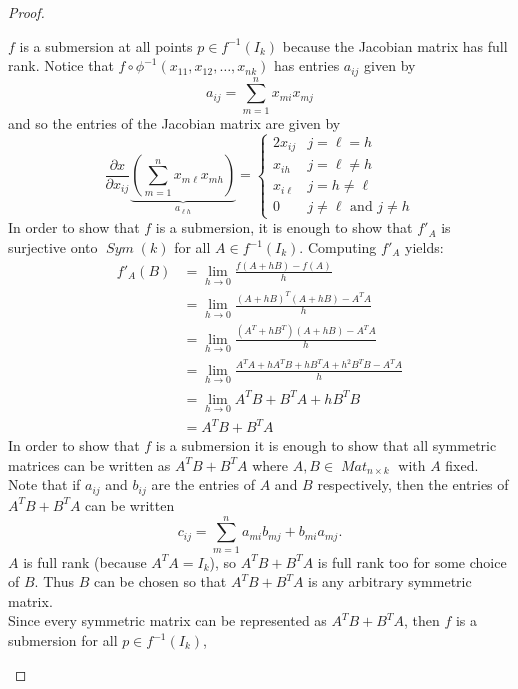 \documentclass{article}
\begin{document}
\begin{proof}
\begin{enumerate}[(a)]
      $f$ is a submersion at all points $p \in f^{-1}(I_k)$ because the Jacobian matrix
      has full rank. Notice that
      $f \circ \phi^{-1}(x_{11}, x_{12}, \hdots, x_{nk})$ has entries $a_{ij}$
      given by \[
        a_{ij} = \sum_{m=1}^{n} x_{mi}x_{mj}
      \] and so the entries of the Jacobian matrix are given by \[
        \frac{\partial x}{\partial x_{ij}}
          \underbrace{\left(\sum_{m=1}^{n} x_{m\ell}x_{mh}\right)}_{a_{\ell h}}
        = \begin{cases}
          2x_{ij} & j = \ell = h \\
          x_{ih} & j = \ell \not= h \\
          x_{i\ell} & j = h \not= \ell \\
          0       & j \not= \ell \text{ and } j \not= h
        \end{cases}
      \]
      In order to show that $f$ is a submersion, it is enough to show that
      $f'_A$ is surjective onto $\operatorname{\mathit{Sym}}(k)$ for all
      $A \in f^{-1}(I_k)$. Computing $f'_A$ yields:
      \begin{align*}
        f'_A(B)
          &= \lim_{h \rightarrow 0} \frac{f(A + hB) - f(A)}{h} \\
          &= \lim_{h \rightarrow 0} \frac{(A + hB)^T(A + hB) - A^TA}{h} \\
          &= \lim_{h \rightarrow 0} \frac{(A^T + hB^T)(A + hB) - A^TA}{h} \\
          &= \lim_{h \rightarrow 0} \frac{A^TA + hA^TB + hB^TA + h^2B^TB - A^TA}{h} \\
          &= \lim_{h \rightarrow 0} A^TB + B^TA + hB^TB \\
          &= A^TB + B^TA
      \end{align*}
      In order to show that $f$ is a submersion it is enough to show that all
      symmetric matrices can be written as
      $A^TB + B^TA$ where $A, B\in \operatorname{\mathit{Mat}}_{n \times k}$
      with $A$ fixed. Note that if $a_{ij}$ and $b_{ij}$ are the entries of
      $A$ and $B$ respectively, then the entries of $A^TB + B^TA$ can be written \[
        c_{ij} = \sum_{m = 1}^n a_{mi}b_{mj} + b_{mi}a_{mj}.
      \]
      $A$ is full rank (because $A^TA = I_k$), so $A^TB + B^TA$ is full rank too
      for some choice of $B$. Thus $B$ can be chosen so that $A^TB + B^TA$ is
      any arbitrary symmetric matrix.
      \\
      Since every symmetric matrix can be represented as
      $A^TB + B^TA$, then $f$ is a submersion for all $p \in f^{-1}(I_k)$,

\end{enumerate}
\end{proof}
\end{document}
